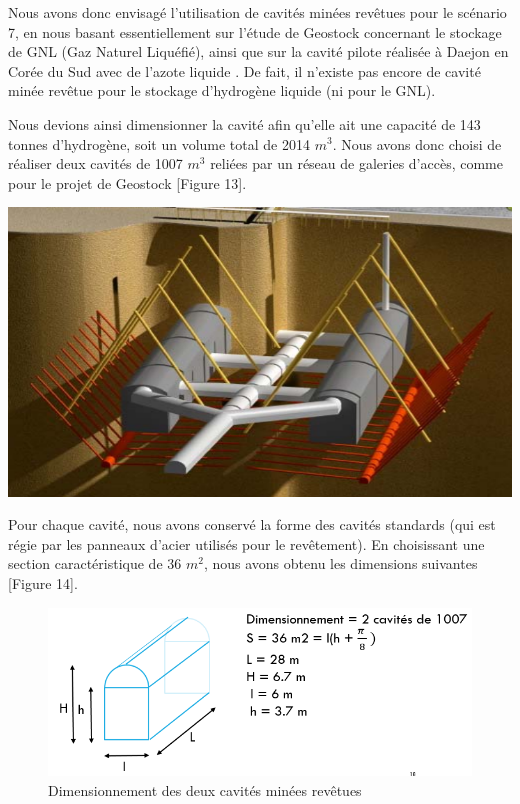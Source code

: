 \documentclass[11pt,french,a4paper]{article}
\begin{document}
\begin{multicols}{2}

Nous avons donc envisagé l’utilisation de cavités minées revêtues pour le scénario 7, en nous basant essentiellement sur l’étude de Geostock concernant le stockage de GNL (Gaz Naturel Liquéfié), ainsi que sur la cavité pilote réalisée à Daejon en Corée du Sud avec de l’azote liquide \cite{Nicolas_2008}. De fait, il n’existe pas encore de cavité minée revêtue pour le stockage d’hydrogène liquide (ni pour le GNL).

Nous devions ainsi dimensionner la cavité afin qu’elle ait une capacité de 143 tonnes d’hydrogène, soit un volume total de 2014 $m^3$. Nous avons donc choisi de réaliser deux cavités de 1007 $m^3$ reliées par un réseau de galeries d’accès, comme pour le projet de Geostock [Figure 13].\\

\begin{center}
\includegraphics[width=\linewidth]{image/chap2/Figure 3.ii.2-1.png}
\end{center}

\end{multicols}

Pour chaque cavité, nous avons conservé la forme des cavités standards (qui est régie par les panneaux d’acier utilisés pour le revêtement). En choisissant une section caractéristique de 36 $m^2$, nous avons obtenu les dimensions suivantes [Figure 14].\\

\begin{figure}[h!]
\centering
\includegraphics[width=.8\linewidth]{image/chap2/Figure 3.ii.2-2.png}
\caption{Dimensionnement des deux cavités minées revêtues}
\end{figure}
\end{document}
